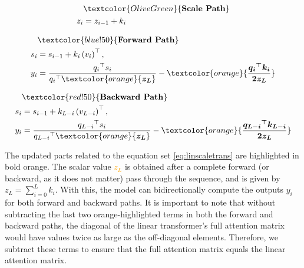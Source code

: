 \begin{minipage}[t]{.3\linewidth}
  \begin{subequations}\label{eq:scale path}
    \begin{align}
    & \textcolor{OliveGreen}{\textbf{Scale Path}} \\
    z_i &= z_{i-1} + k_i \\
    \end{align}
  \end{subequations}
\end{minipage}%
\begin{minipage}[t]{.3\linewidth}
  \begin{subequations}%
    \label{eq:forpass}
    \begin{align}
    & \textcolor{blue!50}{\textbf{Forward Path}} \\
    s_i &= s_{i-1} + {k_i} \left(v_i\right)^{\top}, \\
    y_i &= \frac{{q_i}^{\top} s_i}{{q_i}^{\top} \textcolor{orange}{\boldsymbol{z_L} }} - \textcolor{orange}{\frac{\boldsymbol{q_i}^{\boldsymbol{\top}}\boldsymbol{k_i}}{\boldsymbol{2z_L}}}
    \end{align}
  \end{subequations}
  \end{minipage}
  \begin{minipage}[t]{.4\linewidth}
    \begin{subequations}%
    \label{eq:backpass}
    \begin{align}
    & \textcolor{red!50}{\textbf{Backward Path}} \\
    s_i &= s_{i-1} + {k_{L-i}} \left(v_{L-i}\right)^{\top}, \\
    y_i &= \frac{{q_{L-i}}^{\top} s_i}{{q_{L-i}}^{\top} \textcolor{orange}{\boldsymbol{z_L} }} - \textcolor{orange}{\frac{\boldsymbol{q_{L-i}}^{\boldsymbol{\top}}\boldsymbol{k_{L-i}}}{\boldsymbol{2z_L}}}
    \end{align}
  \end{subequations}
\end{minipage}
The updated parts related to the equation set \ref{eq:linscaletrans} are highlighted in bold orange. The scalar value \textcolor{orange}{$z_L$} is obtained after a complete forward (or backward, as it does not matter) pass through the sequence, and is given by \(z_L = \sum_{i=0}^L k_i\). With this, the model can bidirectionally compute the outputs \(y_i\) for both forward and backward paths. It is important to note that without subtracting the last two orange-highlighted terms in both the forward and backward paths, the diagonal of the linear transformer's full attention matrix would have values twice as large as the off-diagonal elements. Therefore, we subtract these terms to ensure that the full attention matrix equals the linear attention matrix.

